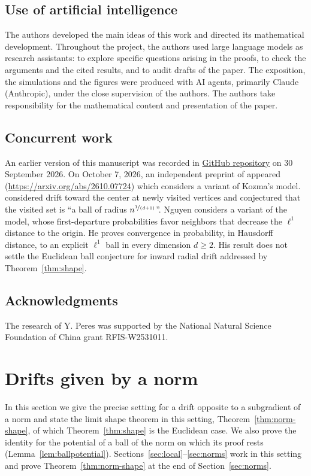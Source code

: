 \documentclass[11pt]{amsart}
\theoremstyle{plain}
\theoremstyle{definition}
\newcommand{\nf}{\nicefrac}
\numberwithin{equation}{section}
\begin{document}
\subsection*{Use of artificial intelligence}
The authors developed the main ideas of this work and directed its mathematical development. Throughout the project, the authors used large language models as research assistants: to explore specific questions arising in the proofs, to check the arguments and the cited results, and to audit drafts of the paper. The exposition, the simulations and the figures were produced with AI agents, primarily Claude (Anthropic), under the close supervision of the authors. The authors take responsibility for the mathematical content and presentation of the paper.

\subsection*{Concurrent work}
An earlier version of this manuscript was recorded in \href{https://github.com/nitromannitol/Centrally-Excited-Random-Walk/commit/4a542809e64452751b0395544b9fe274122884d0}{GitHub repository} on 30 September 2026. On October 7, 2026, an independent preprint of \citet{Nguyen2026} appeared (\url{https://arxiv.org/abs/2610.07724}) which  considers a variant of Kozma's model.  \cite{Oberwolfach2007, Kozma2013} considered drift toward the center at newly visited vertices and conjectured that the visited set is ``a ball of radius $n^{\nf{1}{(d+1)}}$''. Nguyen considers a variant of the model, whose first-departure probabilities favor neighbors that decrease the $\ell^1$ distance to the origin. He proves convergence in probability, in Hausdorff distance, to an explicit $\ell^1$ ball in every dimension $d\geq2$. His result does not settle the Euclidean ball conjecture for inward radial drift addressed by Theorem~\ref{thm:shape}.

\subsection*{Acknowledgments}
The research of Y. Peres was supported by the National Natural Science Foundation of China grant RFIS-W2531011.

\section{Drifts given by a norm}\label{sec:norm-setup}

In this section we give the precise setting for a drift opposite to a subgradient of a norm and state the limit shape theorem in this setting, Theorem~\ref{thm:norm-shape}, of which Theorem~\ref{thm:shape} is the Euclidean case. We also prove the identity for the potential of a ball of the norm on which its proof rests (Lemma~\ref{lem:ballpotential}). Sections~\ref{sec:local}--\ref{sec:norms} work in this setting and prove Theorem~\ref{thm:norm-shape} at the end of Section~\ref{sec:norms}.
\end{document}
